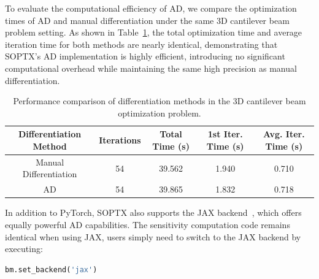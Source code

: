 \documentclass[mathpazo]{cicp}
\begin{document}
To evaluate the computational efficiency of AD, we compare the optimization times of AD and manual differentiation under the same 3D cantilever beam problem setting. As shown in Table~\ref{tab:ad_vs_manual}, the total optimization time and average iteration time for both methods are nearly identical, demonstrating that SOPTX’s AD implementation is highly efficient, introducing no significant computational overhead while maintaining the same high precision as manual differentiation.
\vspace{-0.5ex} %
\begin{table}[htbp]
	\centering
	\setlength{\tabcolsep}{4pt} %
	\caption{Performance comparison of differentiation methods in the 3D cantilever beam optimization problem.}
	\begin{tabular}{ccccc}
		\toprule
		\textbf{Differentiation Method} & \textbf{Iterations} & \textbf{Total Time (s)} & \textbf{1st Iter. Time (s)} & \textbf{Avg. Iter. Time (s)} \\
		\midrule
		Manual Differentiation & 54 & 39.562 & 1.940 & 0.710 \\
		AD & 54 & 39.865 & 1.832 & 0.718 \\
		\bottomrule
	\end{tabular}
	\label{tab:ad_vs_manual}
\end{table}
\vspace{-0.5ex} %

In addition to PyTorch, SOPTX also supports the JAX backend~\cite{bradbury2018jax}, which offers equally powerful AD capabilities. The sensitivity computation code remains identical when using JAX, users simply need to switch to the JAX backend by executing:
\vspace{-0.5ex} %
\begin{lstlisting}[language=python]
bm.set_backend('jax')
\end{lstlisting}
\vspace{-0.5ex} %
\end{document}
